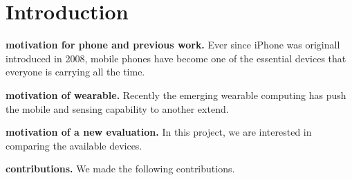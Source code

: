 \section{Introduction}
\label{sec:introduction}

\textbf{motivation for phone and previous work.}
Ever since iPhone was originall introduced in 2008, mobile phones have become one of the essential devices that everyone is carrying all the time.

\textbf{motivation of wearable.} Recently the emerging wearable computing has push the mobile and sensing capability to another extend.

\textbf{motivation of a new evaluation.} In this project, we are interested in comparing the available devices.

\textbf{contributions.} We made the following contributions.


